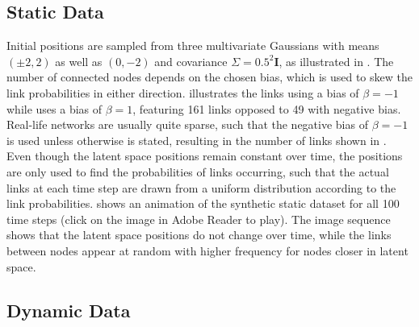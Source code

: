     \subsection{Static Data}
    
        Initial positions are sampled from three multivariate Gaussians with means $(\pm2,2)$ as well as $(0,-2)$ and covariance $\Sigma=0.5^2\bm{I}$, as illustrated in . 
        The number of connected nodes depends on the chosen bias, which is used to skew the link probabilities in either direction.  illustrates the links using a bias of $\beta=-1$ while  uses a bias of $\beta=1$, featuring 161 links opposed to 49 with negative bias.
        Real-life networks are usually quite sparse, such that the negative bias of $\beta=-1$ is used unless otherwise is stated, resulting in the number of links shown in . Even though the latent space positions remain constant over time, the positions are only used to find the probabilities of links occurring, such that the actual links at each time step are drawn from a uniform distribution according to the link probabilities.
         shows an animation of the synthetic static dataset for all 100 time steps (click on the image in Adobe Reader to play). The image sequence shows that the latent space positions do not change over time, while the links between nodes appear at random with higher frequency for nodes closer in latent space.
    
    \subsection{Dynamic Data}
    
